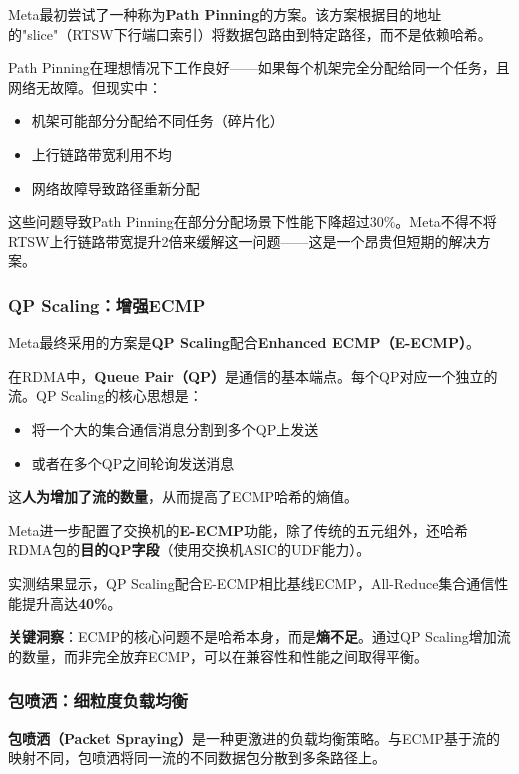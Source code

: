 Meta最初尝试了一种称为\textbf{Path Pinning}的方案。该方案根据目的地址的"slice"（RTSW下行端口索引）将数据包路由到特定路径，而不是依赖哈希。

Path Pinning在理想情况下工作良好——如果每个机架完全分配给同一个任务，且网络无故障。但现实中：
\begin{itemize}
    \item 机架可能部分分配给不同任务（碎片化）
    \item 上行链路带宽利用不均
    \item 网络故障导致路径重新分配
\end{itemize}

这些问题导致Path Pinning在部分分配场景下性能下降超过30\%。Meta不得不将RTSW上行链路带宽提升2倍来缓解这一问题——这是一个昂贵但短期的解决方案。

\subsubsection{QP Scaling：增强ECMP}

Meta最终采用的方案是\textbf{QP Scaling}配合\textbf{Enhanced ECMP（E-ECMP）}。

在RDMA中，\textbf{Queue Pair（QP）}是通信的基本端点。每个QP对应一个独立的流。QP Scaling的核心思想是：

\begin{itemize}
    \item 将一个大的集合通信消息分割到多个QP上发送
    \item 或者在多个QP之间轮询发送消息
\end{itemize}

这\textbf{人为增加了流的数量}，从而提高了ECMP哈希的熵值。

Meta进一步配置了交换机的\textbf{E-ECMP}功能，除了传统的五元组外，还哈希RDMA包的\textbf{目的QP字段}（使用交换机ASIC的UDF能力）。

实测结果显示，QP Scaling配合E-ECMP相比基线ECMP，All-Reduce集合通信性能提升高达\textbf{40\%}。

\textbf{关键洞察}：ECMP的核心问题不是哈希本身，而是\textbf{熵不足}。通过QP Scaling增加流的数量，而非完全放弃ECMP，可以在兼容性和性能之间取得平衡。

\subsubsection{包喷洒：细粒度负载均衡}

\textbf{包喷洒（Packet Spraying）}是一种更激进的负载均衡策略。与ECMP基于流的映射不同，包喷洒将同一流的不同数据包分散到多条路径上。

